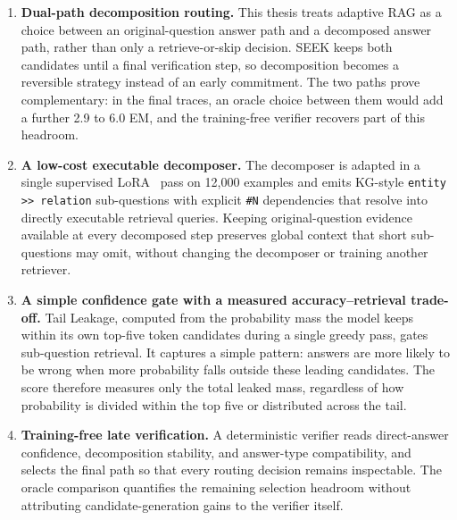 \begin{enumerate}
    \item \textbf{Dual-path decomposition routing.} This thesis treats adaptive RAG as a choice between an original-question answer path and a decomposed answer path, rather than only a retrieve-or-skip decision. SEEK keeps both candidates until a final verification step, so decomposition becomes a reversible strategy instead of an early commitment. The two paths prove complementary: in the final traces, an oracle choice between them would add a further 2.9 to 6.0 EM, and the training-free verifier recovers part of this headroom.

    \item \textbf{A low-cost executable decomposer.} The decomposer is adapted in a single supervised LoRA~\cite{lora} pass on 12{,}000 examples and emits KG-style \texttt{entity >> relation} sub-questions with explicit \texttt{\#N} dependencies that resolve into directly executable retrieval queries. Keeping original-question evidence available at every decomposed step preserves global context that short sub-questions may omit, without changing the decomposer or training another retriever.

    \item \textbf{A simple confidence gate with a measured accuracy--retrieval trade-off.} Tail Leakage, computed from the probability mass the model keeps within its own top-five token candidates during a single greedy pass, gates sub-question retrieval. It captures a simple pattern: answers are more likely to be wrong when more probability falls outside these leading candidates. The score therefore measures only the total leaked mass, regardless of how probability is divided within the top five or distributed across the tail.

    \item \textbf{Training-free late verification.} A deterministic verifier reads direct-answer confidence, decomposition stability, and answer-type compatibility, and selects the final path so that every routing decision remains inspectable. The oracle comparison quantifies the remaining selection headroom without attributing candidate-generation gains to the verifier itself.
\end{enumerate}
